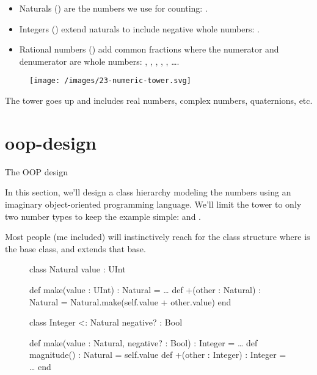 \documentclass{article}
\begin{document}
\begin{itemize}
  \item Naturals () are the numbers we use for counting: .
  \item Integers () extend naturals to include negative whole numbers: .
  \item Rational numbers () add common fractions where the numerator and denumerator are whole numbers: , , , , , \ldots .
\end{itemize}

\begin{figure}[grayscale-diagram,medium-size]
  \texttt{[image: /images/23-numeric-tower.svg]}
\end{figure}

The tower goes up and includes real numbers, complex numbers, quaternions, etc.

\section{oop-design}{The OOP design}

In this section, we'll design a class hierarchy modeling the numbers using an imaginary object-oriented programming language.
We'll limit the tower to only two number types to keep the example simple:  and .

Most people (me included) will instinctively reach for the class structure where  is the base class, and  extends that base.

\begin{figure}
\begin{code}
class Natural
  value : UInt

  def make(value : UInt) : Natural = \ldots
  def +(other : Natural) : Natural = Natural.make(self.value + other.value)
end

class Integer <: Natural
  negative? : Bool

  def make(value : Natural, negative? : Bool) : Integer = \ldots
  def magnitude() : Natural = self.value
  def +(other : Integer) : Integer = \ldots
end
\end{code}
\end{figure}
\end{document}

